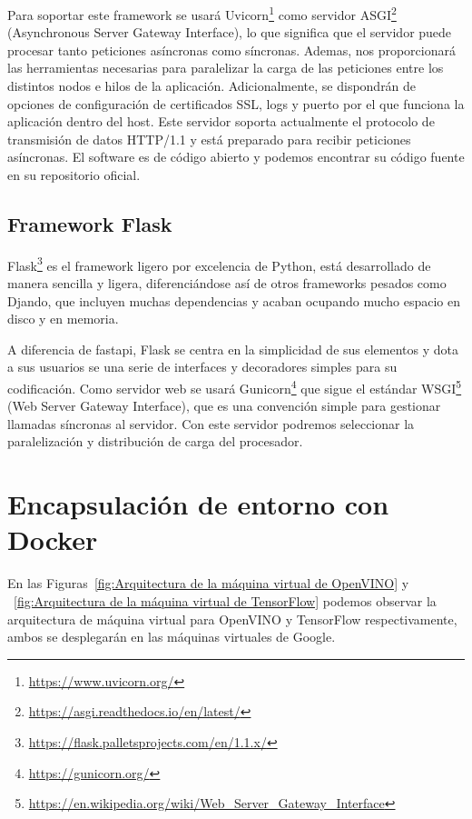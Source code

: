 Para soportar este framework se usará Uvicorn\footnote{\url{https://www.uvicorn.org/}} como servidor ASGI\footnote{\url{https://asgi.readthedocs.io/en/latest/}} (Asynchronous Server Gateway Interface), lo que significa que el servidor puede procesar tanto peticiones asíncronas como síncronas.
Ademas, nos proporcionará las herramientas necesarias para paralelizar la carga de las peticiones entre los distintos nodos e hilos de la aplicación.
Adicionalmente, se dispondrán de opciones de configuración de certificados SSL, logs y puerto por el que funciona la aplicación dentro del host.
Este servidor soporta actualmente el protocolo de transmisión de datos HTTP/1.1 y está preparado para recibir peticiones asíncronas.
El software es de código abierto y podemos encontrar su código fuente en su repositorio oficial.


\subsection{Framework Flask}\label{subsec:framework-flask}
Flask\footnote{\url{https://flask.palletsprojects.com/en/1.1.x/}} es el framework ligero por excelencia de Python, está desarrollado de manera sencilla y ligera, diferenciándose así de otros frameworks pesados como Djando, que incluyen
muchas dependencias y acaban ocupando mucho espacio en disco y en memoria.

A diferencia de fastapi, Flask\cite{python_flask} se centra en la simplicidad de sus elementos y dota a sus usuarios se una serie de interfaces y decoradores simples para su codificación.
Como servidor web se usará Gunicorn\footnote{\url{https://gunicorn.org/}} que sigue el estándar WSGI\footnote{\url{https://en.wikipedia.org/wiki/Web\_Server\_Gateway\_Interface}} (Web Server Gateway Interface), que es una convención simple para gestionar llamadas síncronas al servidor.
Con este servidor podremos seleccionar la paralelización y distribución de carga del procesador.
\section{Encapsulación de entorno con Docker}\label{sec:encapsulación-de-entorno-con-docker}
En las Figuras~\ref{fig:Arquitectura de la máquina virtual de OpenVINO} y ~\ref{fig:Arquitectura de la máquina virtual de TensorFlow} podemos observar la arquitectura de máquina virtual para OpenVINO y TensorFlow respectivamente, ambos se desplegarán en las máquinas virtuales de Google.

